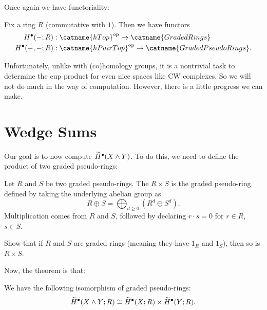 Once again we have functoriality:
\begin{theorem}
	Fix a ring $R$ (commutative with $1$).
	Then we have functors
	\begin{align*}
		H^\bullet(-; R) &: \catname{hTop}\op \to \catname{GradedRings} \\
		H^\bullet(-,-; R) &: \catname{hPairTop}\op \to \catname{GradedPseudoRings}.
	\end{align*}
\end{theorem}

Unfortunately, unlike with (co)homology groups,
it is a nontrivial task to determine the cup product
for even nice spaces like CW complexes.
So we will not do much in the way of computation.
However, there is a little progress we can make.

\section{Wedge Sums}
Our goal is to now compute $\widetilde H^\bullet(X \wedge Y)$.
To do this, we need to define the product of two graded pseudo-rings:
\begin{definition}
	Let $R$ and $S$ be two graded pseudo-rings.
	The  $R \times S$ is the graded pseudo-ring
	defined by taking the underlying abelian group as 
	\[ R \oplus S = \bigoplus_{d \ge 0} (R^d \oplus S^d). \]
	Multiplication comes from $R$ and $S$, followed by
	declaring $r \cdot s = 0$ for $r \in R$, $s \in S$.
\end{definition}
\begin{exercise}
	Show that if $R$ and $S$ are graded rings (meaning they have $1_R$ and $1_S$),
	then so is $R \times S$.
\end{exercise}

Now, the theorem is that:
\begin{theorem}
	We have the following isomorphism of graded pseudo-rings:
	\[
		\widetilde H^\bullet(X \wedge Y; R)
		\cong \widetilde H^\bullet(X;R)
		\times \widetilde H^\bullet(Y;R).
	\]
\end{theorem}

